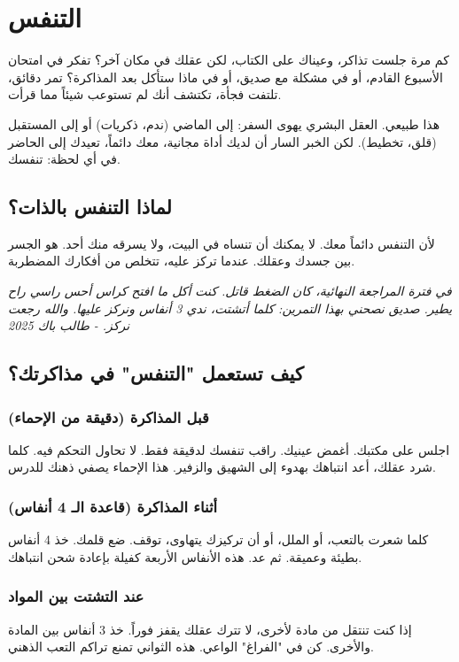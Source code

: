 \documentclass[12pt,a4paper]{book}
\newcommand{\quoteAr}[1]{%
	\begin{myquote}
		\itshape #1
	\end{myquote}
}
\begin{document}
	\section{التنفس}
	\label{sec:breath-anchor}
	
	كم مرة جلست تذاكر، وعيناك على الكتاب، لكن عقلك في مكان آخر؟ تفكر في امتحان الأسبوع القادم، أو في مشكلة مع صديق، أو في ماذا ستأكل بعد المذاكرة؟ تمر دقائق، تلتفت فجأة، تكتشف أنك لم تستوعب شيئاً مما قرأت.
	
	هذا طبيعي. العقل البشري يهوى السفر: إلى الماضي (ندم، ذكريات) أو إلى المستقبل (قلق، تخطيط). لكن الخبر السار أن لديك أداة مجانية، معك دائماً، تعيدك إلى الحاضر في أي لحظة: تنفسك.
	
	\subsection{لماذا التنفس بالذات؟}
	
	لأن التنفس دائماً معك. لا يمكنك أن تنساه في البيت، ولا يسرقه منك أحد. هو الجسر بين جسدك وعقلك. عندما تركز عليه، تتخلص من أفكارك المضطربة.
	
	\quoteAr{في فترة المراجعة النهائية، كان الضغط قاتل. كنت أكل ما افتح كراس أحس راسي راح يطير. صديق نصحني بهذا التمرين: كلما أتشتت، ندي 3 أنفاس ونركز عليها. والله رجعت نركز. - طالب باك 2025}
	
	\subsection{كيف تستعمل "التنفس" في مذاكرتك؟}
	
	\subsubsection*{قبل المذاكرة (دقيقة من الإحماء)}
	اجلس على مكتبك. أغمض عينيك. راقب تنفسك لدقيقة فقط. لا تحاول التحكم فيه. كلما شرد عقلك، أعد انتباهك بهدوء إلى الشهيق والزفير. هذا الإحماء يصفي ذهنك للدرس.
	
	\subsubsection*{أثناء المذاكرة (قاعدة الـ 4 أنفاس)}
	كلما شعرت بالتعب، أو الملل، أو أن تركيزك يتهاوى، توقف. ضع قلمك. خذ 4 أنفاس بطيئة وعميقة. ثم عد. هذه الأنفاس الأربعة كفيلة بإعادة شحن انتباهك.
	
	\subsubsection*{عند التشتت بين المواد}
	إذا كنت تنتقل من مادة لأخرى، لا تترك عقلك يقفز فوراً. خذ 3 أنفاس بين المادة والأخرى. كن في "الفراغ" الواعي. هذه الثواني تمنع تراكم التعب الذهني.
	
\end{document}
